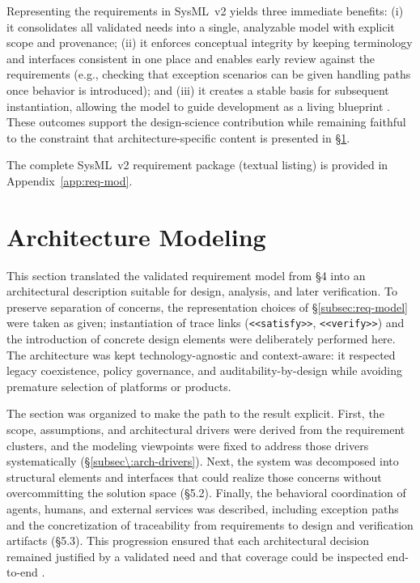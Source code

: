 Representing the requirements in SysML~v2 yields three immediate benefits: (i) it consolidates all validated needs into a single, analyzable model with explicit scope and provenance; (ii) it enforces conceptual integrity by keeping terminology and interfaces consistent in one place and enables early review against the requirements (e.g., checking that exception scenarios can be given handling paths once behavior is introduced); and (iii) it creates a stable basis for subsequent instantiation, allowing the model to guide development as a living blueprint \parencite{peffersDesign2007}. These outcomes support the design-science contribution while remaining faithful to the constraint that architecture-specific content is presented in §\ref{sec:mod-mas}.

\medskip
The complete SysML~v2 requirement package (textual listing) is provided in Appendix~\ref{app:req-mod}.

\section{Architecture Modeling}\label{sec:mod-mas}
This section translated the validated requirement model from §4 into an architectural description suitable for design, analysis, and later verification. To preserve separation of concerns, the representation choices of §\ref{subsec:req-model} were taken as given; instantiation of trace links (\texttt{<<satisfy>>}, \texttt{<<verify>>}) and the introduction of concrete design elements were deliberately performed here. The architecture was kept technology-agnostic and context-aware: it respected legacy coexistence, policy governance, and auditability-by-design while avoiding premature selection of platforms or products.

The section was organized to make the path to the result explicit. First, the scope, assumptions, and architectural drivers were derived from the requirement clusters, and the modeling viewpoints were fixed to address those drivers systematically (§\ref{subsec\:arch-drivers}). Next, the system was decomposed into structural elements and interfaces that could realize those concerns without overcommitting the solution space (§5.2). Finally, the behavioral coordination of agents, humans, and external services was described, including exception paths and the concretization of traceability from requirements to design and verification artifacts (§5.3). This progression ensured that each architectural decision remained justified by a validated need and that coverage could be inspected end-to-end \parencite{IEEEStandard1990,peffersDesign2007}.

